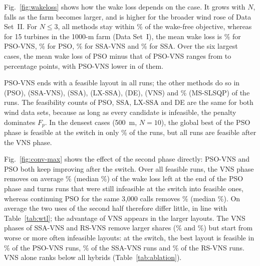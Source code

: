 \documentclass[journal,twoside]{IEEEtran}
\begin{document}
Fig.~\ref{fig:wakeloss} shows how the wake loss depends on the case. It grows with $N$, falls as the farm becomes larger, and is higher for the broader wind rose of Data Set~II. For $N\le3$, all methods stay within \NLossMaxSmallN\% of the wake-free objective, whereas for 15 turbines in the 1000-m farm (Data Set~I), the mean wake loss is \NLossBigIPSOVNS\% for PSO-VNS, \NLossBigIPSO\% for PSO, \NLossBigISSAVNS\% for SSA-VNS and \NLossBigISSA\% for SSA. Over the six largest cases, the mean wake loss of PSO minus that of PSO-VNS ranges from \NBigGainMin{} to \NBigGainMax{} percentage points, with PSO-VNS lower in \NBigGainPos{} of them.

PSO-VNS ends with a feasible layout in all runs; the other methods do so in \NFeasPSO{} (PSO), \NFeasSSAVNS{} (SSA-VNS), \NFeasSSA{} (SSA), \NFeasLXSSA{} (LX-SSA), \NFeasDE{} (DE), \NFeasVNS{} (VNS) and \NFeasSLSQP\% (MS-SLSQP) of the runs. The feasibility counts of PSO, SSA, LX-SSA and DE are the same for both wind data sets, because as long as every candidate is infeasible, the penalty dominates $F_p$. In the densest cases (500~m, $N=10$), the global best of the PSO phase is feasible at the switch in only \NDenseSwitchFeas\% of the runs, but all runs are feasible after the VNS phase.

Fig.~\ref{fig:conv-max} shows the effect of the second phase directly: PSO-VNS and PSO both keep improving after the switch. Over all feasible runs, the VNS phase removes on average \NPhTwoMean\% (median \NPhTwoMedian\%) of the wake loss left at the end of the PSO phase and turns \NPhTwoMadeFeas{} runs that were still infeasible at the switch into feasible ones, whereas continuing PSO for the same 3,000 calls removes \NPsoContMean\% (median \NPsoContMedian\%). On average the two uses of the second half therefore differ little, in line with Table~\ref{tab:wtl}; the advantage of VNS appears in the larger layouts. The VNS phases of SSA-VNS and RS-VNS remove larger shares (\NPhTwoMeanSSAVNS\% and \NPhTwoMeanRSVNS\%) but start from worse or more often infeasible layouts: at the switch, the best layout is feasible in \NSwitchFeasPSOVNS\% of the PSO-VNS runs, \NSwitchFeasSSAVNS\% of the SSA-VNS runs and \NSwitchFeasRSVNS\% of the RS-VNS runs. VNS alone ranks below all hybrids (Table~\ref{tab:ablation}).
\end{document}
